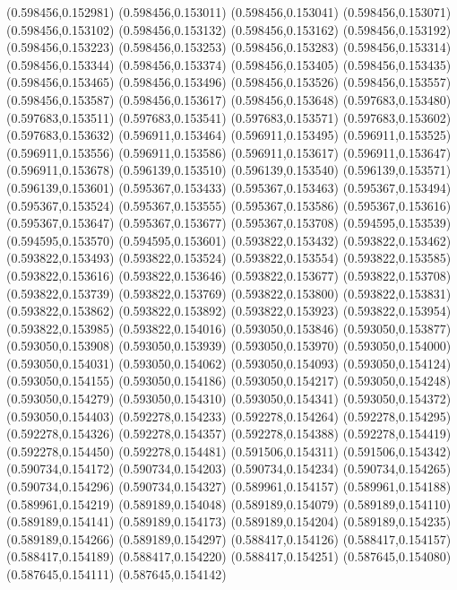 (0.598456,0.152981)
(0.598456,0.153011)
(0.598456,0.153041)
(0.598456,0.153071)
(0.598456,0.153102)
(0.598456,0.153132)
(0.598456,0.153162)
(0.598456,0.153192)
(0.598456,0.153223)
(0.598456,0.153253)
(0.598456,0.153283)
(0.598456,0.153314)
(0.598456,0.153344)
(0.598456,0.153374)
(0.598456,0.153405)
(0.598456,0.153435)
(0.598456,0.153465)
(0.598456,0.153496)
(0.598456,0.153526)
(0.598456,0.153557)
(0.598456,0.153587)
(0.598456,0.153617)
(0.598456,0.153648)
(0.597683,0.153480)
(0.597683,0.153511)
(0.597683,0.153541)
(0.597683,0.153571)
(0.597683,0.153602)
(0.597683,0.153632)
(0.596911,0.153464)
(0.596911,0.153495)
(0.596911,0.153525)
(0.596911,0.153556)
(0.596911,0.153586)
(0.596911,0.153617)
(0.596911,0.153647)
(0.596911,0.153678)
(0.596139,0.153510)
(0.596139,0.153540)
(0.596139,0.153571)
(0.596139,0.153601)
(0.595367,0.153433)
(0.595367,0.153463)
(0.595367,0.153494)
(0.595367,0.153524)
(0.595367,0.153555)
(0.595367,0.153586)
(0.595367,0.153616)
(0.595367,0.153647)
(0.595367,0.153677)
(0.595367,0.153708)
(0.594595,0.153539)
(0.594595,0.153570)
(0.594595,0.153601)
(0.593822,0.153432)
(0.593822,0.153462)
(0.593822,0.153493)
(0.593822,0.153524)
(0.593822,0.153554)
(0.593822,0.153585)
(0.593822,0.153616)
(0.593822,0.153646)
(0.593822,0.153677)
(0.593822,0.153708)
(0.593822,0.153739)
(0.593822,0.153769)
(0.593822,0.153800)
(0.593822,0.153831)
(0.593822,0.153862)
(0.593822,0.153892)
(0.593822,0.153923)
(0.593822,0.153954)
(0.593822,0.153985)
(0.593822,0.154016)
(0.593050,0.153846)
(0.593050,0.153877)
(0.593050,0.153908)
(0.593050,0.153939)
(0.593050,0.153970)
(0.593050,0.154000)
(0.593050,0.154031)
(0.593050,0.154062)
(0.593050,0.154093)
(0.593050,0.154124)
(0.593050,0.154155)
(0.593050,0.154186)
(0.593050,0.154217)
(0.593050,0.154248)
(0.593050,0.154279)
(0.593050,0.154310)
(0.593050,0.154341)
(0.593050,0.154372)
(0.593050,0.154403)
(0.592278,0.154233)
(0.592278,0.154264)
(0.592278,0.154295)
(0.592278,0.154326)
(0.592278,0.154357)
(0.592278,0.154388)
(0.592278,0.154419)
(0.592278,0.154450)
(0.592278,0.154481)
(0.591506,0.154311)
(0.591506,0.154342)
(0.590734,0.154172)
(0.590734,0.154203)
(0.590734,0.154234)
(0.590734,0.154265)
(0.590734,0.154296)
(0.590734,0.154327)
(0.589961,0.154157)
(0.589961,0.154188)
(0.589961,0.154219)
(0.589189,0.154048)
(0.589189,0.154079)
(0.589189,0.154110)
(0.589189,0.154141)
(0.589189,0.154173)
(0.589189,0.154204)
(0.589189,0.154235)
(0.589189,0.154266)
(0.589189,0.154297)
(0.588417,0.154126)
(0.588417,0.154157)
(0.588417,0.154189)
(0.588417,0.154220)
(0.588417,0.154251)
(0.587645,0.154080)
(0.587645,0.154111)
(0.587645,0.154142)
